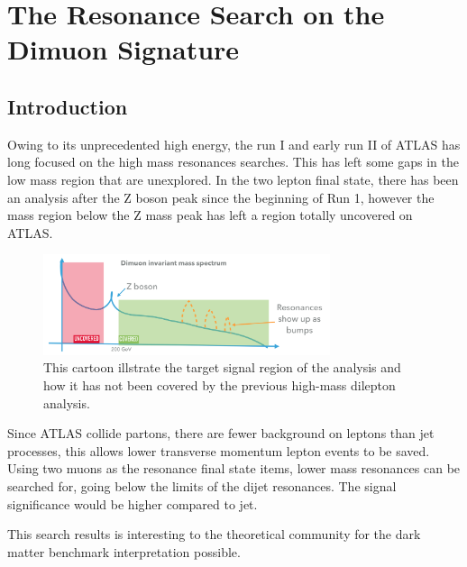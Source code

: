 \chapter{The Resonance Search on the Dimuon Signature}
\label{chapter:dimuon}

\section{Introduction}

    Owing to its unprecedented high energy, the run I and early run II of ATLAS has long focused on the high mass resonances searches. This has left some gaps in the low mass region that are unexplored. In the two lepton final state, there has been an analysis after the Z boson peak since the beginning of Run 1, however the mass region below the Z mass peak has left a region totally uncovered on ATLAS.

\begin{figure}[!htb]
    \begin{center}
        \includegraphics[width=0.75\textwidth]{figures/chapter_dimuon/dimuonStudies}        
        \caption{
        This cartoon illstrate the target signal region of the analysis and how it has not been covered by the previous high-mass dilepton analysis. }
            \label{fig:dimuonstudies}
    \end{center}
\end{figure}
   
    Since ATLAS collide partons, there are fewer background on leptons than jet processes, this allows lower transverse momentum lepton events to be saved. Using two muons as the resonance final state items, lower mass resonances can be searched for, going below the limits of the dijet resonances. The signal significance would be higher compared to jet. 

    This search results is interesting to the theoretical community for the dark matter benchmark interpretation possible.

%
%    


